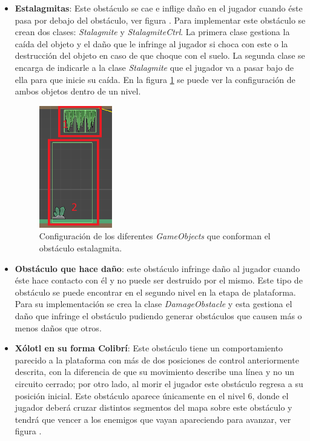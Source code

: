\begin{itemize}
        \item \textbf{Estalagmitas}: Este obstáculo se cae e inflige daño en el
        jugador cuando éste pasa por debajo del obstáculo, ver figura .  Para
        implementar este obstáculo se crean dos clases: \textit{Stalagmite} y
        \textit{StalagmiteCtrl}. La primera clase gestiona la caída del objeto y el
        daño que le infringe al jugador si choca con este o la destrucción del objeto
        en caso de que choque con el suelo. La segunda clase se encarga de indicarle
        a la clase \textit{Stalagmite} que el jugador va a pasar bajo de ella para que
        inicie su caída. En la figura \ref{fig:StalagmiteConf} se puede ver la
        configuración de ambos objetos dentro de un nivel.
        
            \begin{figure}[h]
                \centering
                \includegraphics[width=0.3\textwidth]{03TrabajoRealizado/imagenes/StalagmiteConfig.png}
                \caption{Configuración de los diferentes \textit{GameObjects} que
                conforman el obstáculo estalagmita.}
                \label{fig:StalagmiteConf}
            \end{figure}
        
        \item \textbf{Obstáculo que hace daño}: este obstáculo infringe daño al jugador
        cuando éste hace contacto con él y no puede ser destruido por el mismo. Este
        tipo de obstáculo se puede encontrar en el segundo nivel en la etapa de
        plataforma. Para su implementación se crea la clase \textit{DamageObstacle} y 
        esta
        gestiona el daño que infringe el obstáculo pudiendo generar obstáculos que
        causen más o menos daños que otros.

        \item \textbf{Xólotl en su forma Colibrí}: Este obstáculo tiene un
        comportamiento parecido a la plataforma con más de dos posiciones de
        control anteriormente descrita, con la diferencia de que su movimiento
        describe una línea y no un circuito cerrado; por otro lado, al morir el
        jugador este obstáculo regresa a su posición inicial. Este obstáculo aparece
        únicamente en el nivel 6, donde el jugador deberá cruzar distintos segmentos
        del mapa sobre este obstáculo y tendrá que vencer a los enemigos que vayan
        apareciendo para avanzar, ver figura .
    \end{itemize}

